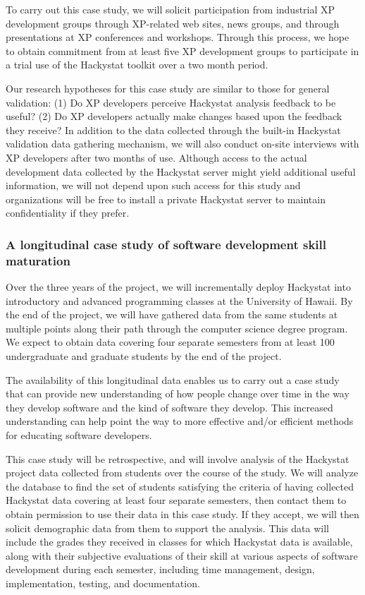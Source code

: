 To carry out this case study, we will solicit participation from industrial
XP development groups through XP-related web sites, news groups, and
through presentations at XP conferences and workshops. Through this
process, we hope to obtain commitment from at least five XP development
groups to participate in a trial use of the Hackystat toolkit over a two
month period. 

Our research hypotheses for this case study are similar to those for
general validation: (1) Do XP developers perceive Hackystat analysis
feedback to be useful? (2) Do XP developers actually make changes based
upon the feedback they receive?  In addition to the data collected through
the built-in Hackystat validation data gathering mechanism, we will also
conduct on-site interviews with XP developers after two months of use.
Although access to the actual development data collected by the Hackystat
server might yield additional useful information, we will not depend upon
such access for this study and organizations will be free to install a
private Hackystat server to maintain confidentiality if they prefer.

\subsubsection{A longitudinal case study of software development skill maturation}

Over the three years of the project, we will incrementally deploy Hackystat
into introductory and advanced programming classes at the University of
Hawaii.  By the end of the project, we will have gathered data from the same
students at multiple points along their path through the computer
science degree program.  We expect to obtain data covering four separate
semesters from at least 100 undergraduate and graduate students by the end
of the project.

The availability of this longitudinal data enables us to carry out a case
study that can provide new understanding of how people change over time in
the way they develop software and the kind of software they develop.  This
increased understanding can help point the way to more effective and/or
efficient methods for educating software developers.

This case study will be retrospective, and will involve analysis of the
Hackystat project data collected from students over the course of the
study.  We will analyze the database to find the set of students satisfying
the criteria of having collected Hackystat data covering at least four
separate semesters, then contact them to obtain permission to use their
data in this case study. If they accept, we will then solicit demographic
data from them to support the analysis.  This data will include the grades
they received in classes for which Hackystat data is available, along with
their subjective evaluations of their skill at various aspects of software
development during each semester, including time management, design,
implementation, testing, and documentation.  

